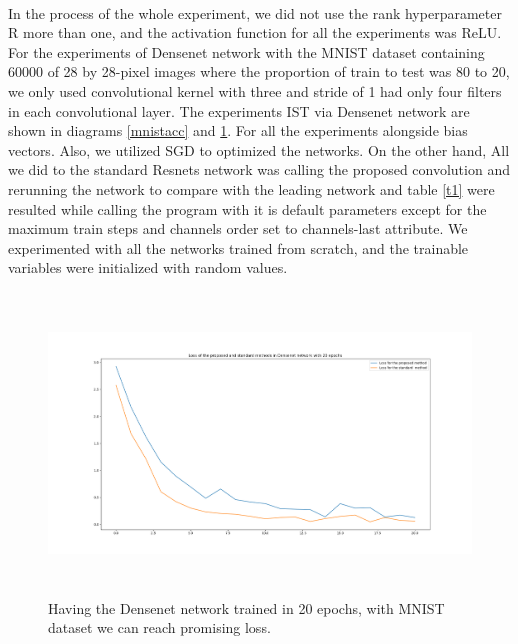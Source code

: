 \documentclass{report}
\begin{document}
\paragraph*{}
In the process of the whole experiment, we did not use the rank hyperparameter R more than one, and the activation function for all the experiments was ReLU. For the experiments of Densenet network \cite{dense} with the MNIST dataset containing 60000 of 28 by 28-pixel images where the proportion of train to test was 80 to 20, we only used convolutional kernel with three and stride of 1 had only four filters in each convolutional layer. The experiments 
IST via Densenet network are shown in diagrams \ref{mnistacc} and \ref{mnistloss}. For all the experiments alongside bias vectors. Also, we utilized SGD to optimized the networks. On the other hand, All we did to the standard Resnets network was calling the proposed convolution and rerunning the network to compare with the leading network and table
\ref{t1}
were resulted while calling the program with it is default parameters except for the maximum train steps and channels order set to channels-last attribute. We experimented with all the networks trained from scratch, and the trainable variables were initialized with random values.


\begin{figure}[h!]
	\begin{center}
		\includegraphics[height=8cm]{densenet_mnist_loss.png}
	\end{center}
	\label{mnistloss}
	\caption{Having the Densenet network trained in 20 epochs, with MNIST dataset we can reach promising loss.
	}
\end{figure}
\end{document}
